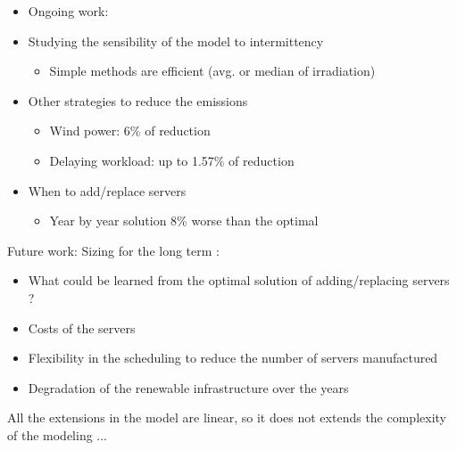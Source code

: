 \begin{itemize}
  \item Ongoing work:  
  \item Studying the sensibility of the model to intermittency    
    \begin{itemize}      
    \item Simple methods are efficient (avg. or median of irradiation)
    \end{itemize}

  \item Other strategies to reduce the  emissions
    \begin{itemize}      
    \item Wind power: 6\% of reduction
    \item Delaying workload: up to 1.57\% of reduction      
    \end{itemize}
    
  \item When to add/replace servers

    \begin{itemize}
      
    \item Year by year solution 8\% worse than the optimal

      
    \end{itemize}
    
    
  \end{itemize}
Future work:   Sizing for the long term :

  \begin{itemize}
    
  \item What could be learned from the optimal solution of adding/replacing servers ?
  \item Costs of the servers     
  \item Flexibility in the scheduling to reduce the number of
    servers manufactured
  \item Degradation of the renewable infrastructure over the years
    
  \end{itemize}    


  All the extensions in the model are linear, so it does not extends the complexity of the modeling ...
